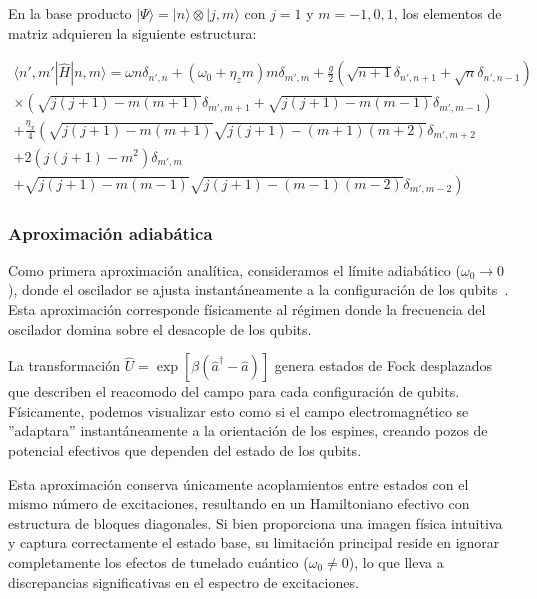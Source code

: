 \documentclass[onecolumn,notitlepage,letterpaper,aps,pra,12pt]{article}
\numberwithin{equation}{section}
\begin{document}
En la base producto $|\Psi\rangle = |n\rangle \otimes |j, m\rangle$ con $j=1$ y $m = -1, 0, 1$, los elementos de matriz adquieren la siguiente estructura:

\small{ 
\begin{gather}
    \langle n', m' | \hat{H} | n, m \rangle 
    = \omega n\delta_{n',n} + \left(\omega_{0} + \eta_{z}m\right) m\delta_{m',m} 
    + \frac{g}{2}\left( \sqrt{n+1}\delta_{n',n+1} + \sqrt{n}\delta_{n',n-1} \right) \nonumber \\
    \times\left(\sqrt{j(j+1) - m(m+1)}\delta_{m',m+1} + \sqrt{j(j+1) - m(m-1)}\delta_{m',m-1}\right) \nonumber \\
    +\frac{\eta_{x}}{4}\left(\sqrt{j(j+1)-m(m+1)}\sqrt{j(j+1)-(m+1)(m+2)}\delta_{m',m+2} \right. \nonumber \\
    \left. +2\left(j(j+1) - m^{2}\right)\delta_{m',m} \right. \nonumber \\
    \left. +\sqrt{j(j+1) - m(m-1)}\sqrt{j(j+1)-(m-1)(m-2)}\delta_{m',m-2}\right) \label{numerica two qubit}
\end{gather}}   


\subsubsection{Aproximación adiabática}

Como primera aproximación analítica, consideramos el límite adiabático ($\omega_0 \rightarrow 0$), donde el oscilador se ajusta instantáneamente a la configuración de los qubits~\cite{irish2005}. Esta aproximación corresponde físicamente al régimen donde la frecuencia del oscilador domina sobre el desacople de los qubits.

La transformación $\hat{U} = \exp\left[{\beta(\hat{a}^{\dagger}-\hat{a})}\right]$ genera estados de Fock desplazados que describen el reacomodo del campo para cada configuración de qubits. Físicamente, podemos visualizar esto como si el campo electromagnético se ''adaptara'' instantáneamente a la orientación de los espines, creando pozos de potencial efectivos que dependen del estado de los qubits.

Esta aproximación conserva únicamente acoplamientos entre estados con el mismo número de excitaciones, resultando en un Hamiltoniano efectivo con estructura de bloques diagonales. Si bien proporciona una imagen física intuitiva y captura correctamente el estado base, su limitación principal reside en ignorar completamente los efectos de tunelado cuántico ($\omega_0 \neq 0$), lo que lleva a discrepancias significativas en el espectro de excitaciones.
\end{document}
